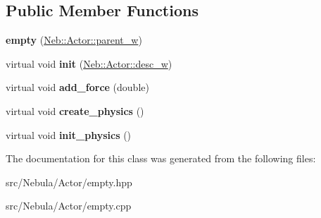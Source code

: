 \subsection*{\-Public \-Member \-Functions}
\begin{DoxyCompactItemize}
\item 
\hypertarget{classneb_1_1Actor_1_1empty_ac9892c883ff1ad7b22ec43142d18f9e9}{{\bfseries empty} (\hyperlink{classNeb_1_1weak__ptr}{\-Neb\-::\-Actor\-::parent\-\_\-w})}\label{classneb_1_1Actor_1_1empty_ac9892c883ff1ad7b22ec43142d18f9e9}

\item 
\hypertarget{classneb_1_1Actor_1_1empty_adef9eaa1dfbc51f1be6acd3b480ee27a}{virtual void {\bfseries init} (\hyperlink{classNeb_1_1weak__ptr}{\-Neb\-::\-Actor\-::desc\-\_\-w})}\label{classneb_1_1Actor_1_1empty_adef9eaa1dfbc51f1be6acd3b480ee27a}

\item 
\hypertarget{classneb_1_1Actor_1_1empty_a473dcef1b8de90a5178e506406e5f383}{virtual void {\bfseries add\-\_\-force} (double)}\label{classneb_1_1Actor_1_1empty_a473dcef1b8de90a5178e506406e5f383}

\item 
\hypertarget{classneb_1_1Actor_1_1empty_ab1ab81960ecca1bf3f2410906cdee3e1}{virtual void {\bfseries create\-\_\-physics} ()}\label{classneb_1_1Actor_1_1empty_ab1ab81960ecca1bf3f2410906cdee3e1}

\item 
\hypertarget{classneb_1_1Actor_1_1empty_aa0e380242b5613196fe6d1dac5cb6b4d}{virtual void {\bfseries init\-\_\-physics} ()}\label{classneb_1_1Actor_1_1empty_aa0e380242b5613196fe6d1dac5cb6b4d}

\end{DoxyCompactItemize}


\-The documentation for this class was generated from the following files\-:\begin{DoxyCompactItemize}
\item 
src/\-Nebula/\-Actor/empty.\-hpp\item 
src/\-Nebula/\-Actor/empty.\-cpp\end{DoxyCompactItemize}
